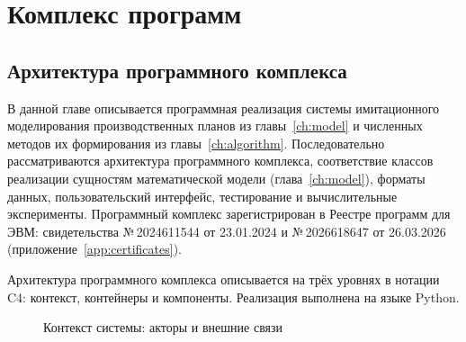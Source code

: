 \chapter{Комплекс программ}
\label{chap:experiments}
\section{Архитектура программного комплекса}\label{sec:software/c4}
В данной главе описывается программная реализация системы имитационного моделирования производственных планов из главы~\ref{ch:model} и численных методов их формирования из главы~\ref{ch:algorithm}.
Последовательно рассматриваются архитектура программного комплекса, соответствие классов реализации сущностям математической модели (глава~\ref{ch:model}), форматы данных, пользовательский интерфейс, тестирование и вычислительные эксперименты.
Программный комплекс зарегистрирован в Реестре программ для ЭВМ: свидетельства №\,2024611544 от 23.01.2024 и №\,2026618647 от 26.03.2026 (приложение~\ref{app:certificates}).

Архитектура программного комплекса описывается на трёх уровнях в нотации C4: контекст, контейнеры и компоненты.
Реализация выполнена на языке Python.
\begin{figure}[htbp]
    \centering
    \caption{Контекст системы: акторы и внешние связи}
    \label{fig:c4-context}
\end{figure}

